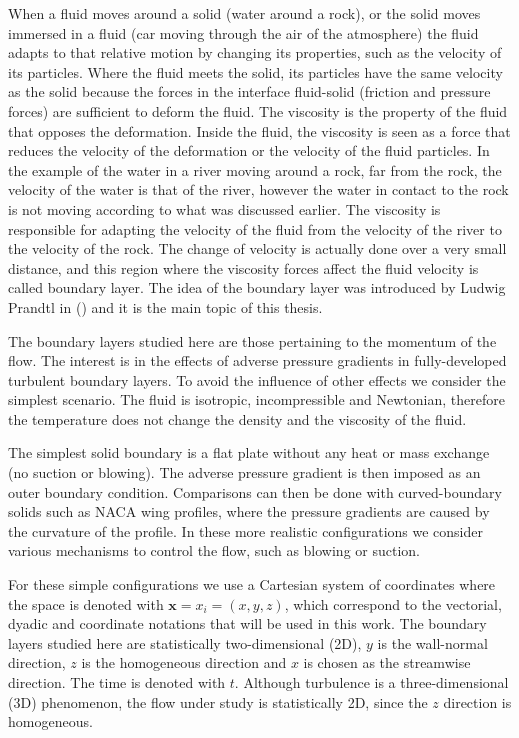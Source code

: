 When a fluid moves around a solid (water around a rock), or the solid moves immersed in a fluid  (car moving through the air of the atmosphere) the fluid adapts to that relative motion by changing its properties, such as the velocity of its particles.
Where the fluid meets the solid, its particles have the same velocity as the solid because the forces in the interface fluid-solid (friction and pressure forces) are sufficient to deform the fluid.
The viscosity is the property of the fluid that opposes the deformation. Inside the fluid, the viscosity is seen as a force that reduces the velocity of the deformation or the velocity of the fluid particles.
In the example of the water in a river moving around a rock, far from the rock, the velocity of the water is that of the river, however the water in contact to the rock is not moving according to what was discussed earlier. The viscosity is responsible for adapting the velocity of the fluid from the velocity of the river to the velocity of the rock.
The change of velocity is actually done over a very small distance, and this region where the viscosity forces affect the fluid velocity is called boundary layer. 
The idea of the boundary layer was introduced by Ludwig Prandtl in (\citeyear{Prandtl04}) and it is the main topic of this thesis.

The boundary layers studied here are those pertaining to the momentum of the flow. The interest is in the effects of adverse pressure gradients in fully-developed turbulent boundary layers. To avoid the influence of other effects we consider the simplest scenario.
The fluid is isotropic, incompressible and Newtonian, therefore the temperature does not change the density and the viscosity of the fluid.

The simplest solid boundary is a flat plate without any heat or mass exchange (no suction or blowing). The adverse pressure gradient is then imposed as an outer boundary condition.
Comparisons can then be done with curved-boundary solids such as NACA wing profiles, where the pressure gradients are caused by the curvature of the profile. 
In these more realistic configurations we consider various mechanisms to control the flow, such as blowing or suction.

For these simple configurations we use a Cartesian system of coordinates where the space is denoted with $\pmb{x}=x_i=(x,y,z)$, which correspond to the vectorial, dyadic and coordinate notations that will be used in this work.
The boundary layers studied here are statistically two-dimensional (2D), $y$ is the wall-normal direction, $z$ is the homogeneous direction and $x$ is chosen as the streamwise direction. The time is denoted with $t$.
Although turbulence is a three-dimensional (3D) phenomenon, the flow under study is statistically 2D, since the $z$ direction is homogeneous.